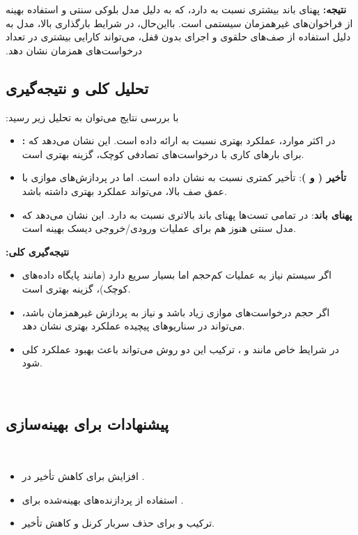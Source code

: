 ‫
‫\textbf{نتیجه:}  پهنای باند بیشتری نسبت به  دارد، که به دلیل مدل بلوکی سنتی  و استفاده بهینه از فراخوان‌های غیرهمزمان سیستمی است. بااین‌حال، در شرایط بارگذاری بالا، مدل  به دلیل استفاده از صف‌های حلقوی و اجرای بدون قفل، می‌تواند کارایی بیشتری در تعداد درخواست‌های همزمان نشان دهد.
‫
‫\subsection*{تحلیل کلی و نتیجه‌گیری}
‫
‫با بررسی نتایج می‌توان به تحلیل زیر رسید:
‫
‫\begin{itemize}
‫	\item \textbf{:} در اکثر موارد،  عملکرد بهتری نسبت به  ارائه داده است. این نشان می‌دهد که برای بارهای کاری با درخواست‌های تصادفی کوچک،  گزینه بهتری است.
‫	\item \textbf{تأخیر ( و )}:  تأخیر کمتری نسبت به  نشان داده است. اما در پردازش‌های موازی با عمق صف بالا،  می‌تواند عملکرد بهتری داشته باشد.
‫	\item \textbf{پهنای باند}:  در تمامی تست‌ها پهنای باند بالاتری نسبت به  دارد. این نشان می‌دهد که مدل سنتی  هنوز هم برای عملیات ورودی/خروجی دیسک بهینه است.
‫\end{itemize}
‫
‫\textbf{نتیجه‌گیری کلی:}
‫\begin{itemize}
‫	\item اگر سیستم نیاز به عملیات  کم‌حجم اما بسیار سریع دارد (مانند پایگاه داده‌های کوچک)،  گزینه بهتری است.
‫	\item اگر حجم درخواست‌های موازی زیاد باشد و نیاز به پردازش غیرهمزمان باشد،  می‌تواند در سناریوهای پیچیده عملکرد بهتری نشان دهد.
‫	\item در شرایط خاص مانند  و ، ترکیب این دو روش می‌تواند باعث بهبود عملکرد کلی شود.
‫\end{itemize}
‫
‫\subsection*{پیشنهادات برای بهینه‌سازی}
‫\begin{itemize}
‫	\item افزایش  برای کاهش تأخیر در .
‫	\item استفاده از پردازنده‌های بهینه‌شده برای .
‫	\item ترکیب  و  برای حذف سربار کرنل و کاهش تأخیر.
‫\end{itemize}
